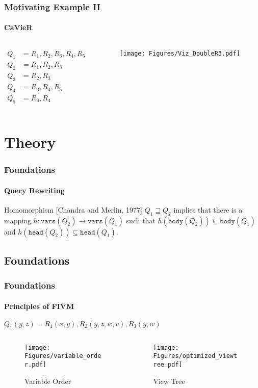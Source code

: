 \documentclass[
	11pt, %
]{beamer}
\begin{document}
\begin{frame}
	\frametitle{Motivating Example II}
	\framesubtitle{CaVieR}
	\begin{columns}
		\begin{column}{0.3\textwidth}
			\begin{align*}
				Q_1 &= R_1, R_2, R_3, R_4, R_5\\
				Q_2 &= R_1, R_2, R_3\\
				Q_3 &= R_2, R_3\\
				Q_4 &= R_3, R_4, R_5\\
				Q_5 &= R_3, R_4
			\end{align*}
		\end{column}
		
		\begin{column}{0.7\textwidth}
			\begin{figure}
				\texttt{[image: Figures/Viz\_DoubleR3.pdf]}
			\end{figure}
		\end{column}
		
	\end{columns}
\end{frame}

\section{Theory} 
\begin{frame}
	\frametitle{Foundations}
	\framesubtitle{Query Rewriting}
	\begin{block}{Homomorphism [Chandra and Merlin, 1977]}
		$Q_1 \sqsupseteq Q_2$ implies that there is a mapping $h: \texttt{vars}(Q_2) \rightarrow \texttt{vars}(Q_1)$ such that $h(\texttt{body}(Q_2)) \subseteq \texttt{body}(Q_1)$ and $h(\texttt{head}(Q_2)) \subseteq \texttt{head}(Q_1)$. 
	\end{block}
\end{frame}


\subsection{Foundations}
\begin{frame}
		\frametitle{Foundations}
		\framesubtitle{Principles of FIVM}


		$Q_1(y,z) = R_1(x, y), R_2(y,z,w,v), R_3(y,w)$
		\begin{columns}[c] 
			\begin{column}{0.45\textwidth} 
				\begin{figure}
					\texttt{[image: Figures/variable\_order.pdf]}
					\caption{Variable Order}
				\end{figure}
			\end{column}
			\begin{column}{0.45\textwidth} 
				\begin{figure}
					\texttt{[image: Figures/optimized\_viewtree.pdf]}
					\caption{View Tree}
				\end{figure}
			\end{column}
		\end{columns}
\end{frame}
\end{document}
